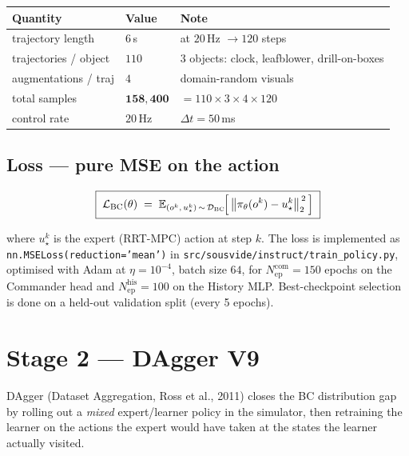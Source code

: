 \documentclass[11pt, a4paper]{article}
\newcommand{\E}{\mathbb{E}}
\newcommand{\D}{\mathcal{D}}
\newcommand{\cL}{\mathcal{L}}
\begin{document}
\begin{center}
\begin{tabular}{lll}
\toprule
\textbf{Quantity} & \textbf{Value} & \textbf{Note} \\
\midrule
trajectory length     & $6$\,s            & at $20$\,Hz $\to 120$ steps \\
trajectories / object & $110$             & 3 objects: clock, leafblower, drill-on-boxes \\
augmentations / traj  & $4$               & domain-random visuals \\
total samples         & $\mathbf{158{,}400}$ & $= 110 \times 3 \times 4 \times 120$ \\
control rate          & $20$\,Hz          & $\Delta t = 50$\,ms \\
\bottomrule
\end{tabular}
\end{center}

\subsection{Loss --- pure MSE on the action}

\begin{formulabox}
\begin{equation}
\boxed{\;
\cL_{\text{BC}}(\theta)
   \;=\; \E_{(o^k,\,u^k_\star)\,\sim\,\D_{\text{BC}}}
         \!\Bigl[\,\bigl\|\pi_\theta(o^k) - u^k_\star\bigr\|_2^{\,2}\,\Bigr]
\;}
\label{eq:bc}
\end{equation}
\end{formulabox}

\noindent
where $u^k_\star$ is the expert (RRT-MPC) action at step $k$.
The loss is implemented as
\texttt{nn.MSELoss(reduction='mean')} in
\texttt{src/sousvide/instruct/train\_policy.py}, optimised with Adam at
$\eta = 10^{-4}$, batch size $64$, for $N_{\text{ep}}^{\text{com}} = 150$
epochs on the Commander head and $N_{\text{ep}}^{\text{his}} = 100$ on the
History MLP. Best-checkpoint selection is done on a held-out validation
split (every 5 epochs).

\section{Stage 2 --- DAgger V9}

DAgger (Dataset Aggregation, Ross et al., 2011) closes the BC distribution
gap by rolling out a \emph{mixed} expert/learner policy in the simulator,
then retraining the learner on the actions the expert would have taken at
the states the learner actually visited.
\end{document}
